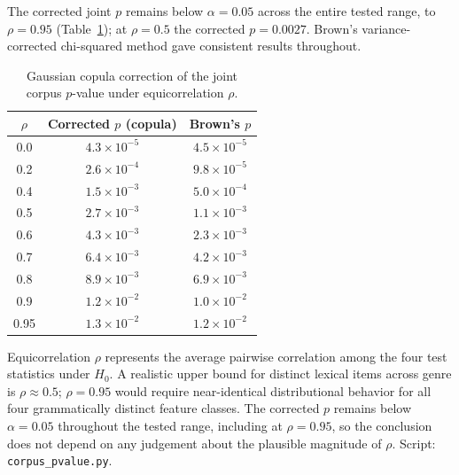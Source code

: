 \documentclass[11pt,a4paper]{article}
\begin{document}
The corrected joint $p$ remains below $\alpha = 0.05$ across the entire
tested range, to $\rho = 0.95$ (Table~\ref{tab:copula}); at $\rho=0.5$ the
corrected $p = 0.0027$. Brown's variance-corrected chi-squared
method\cite{brown1975} gave consistent results throughout.

\begin{table}[h]
\centering
\begin{threeparttable}
  \caption{Gaussian copula correction of the joint corpus $p$-value under
    equicorrelation $\rho$.}\label{tab:copula}
\begin{tabular}{@{}ccc@{}}
\toprule
$\rho$ & Corrected $p$ (copula) & Brown's $p$ \\
\midrule
0.0  & $4.3\times10^{-5}$ & $4.5\times10^{-5}$ \\
0.2  & $2.6\times10^{-4}$ & $9.8\times10^{-5}$ \\
0.4  & $1.5\times10^{-3}$ & $5.0\times10^{-4}$ \\
0.5  & $2.7\times10^{-3}$ & $1.1\times10^{-3}$ \\
0.6  & $4.3\times10^{-3}$ & $2.3\times10^{-3}$ \\
0.7  & $6.4\times10^{-3}$ & $4.2\times10^{-3}$ \\
0.8  & $8.9\times10^{-3}$ & $6.9\times10^{-3}$ \\
0.9  & $1.2\times10^{-2}$ & $1.0\times10^{-2}$ \\
0.95 & $1.3\times10^{-2}$ & $1.2\times10^{-2}$ \\
\bottomrule
\end{tabular}
  \begin{tablenotes}
    \footnotesize
    \item Equicorrelation $\rho$ represents the average pairwise
    correlation among the four test statistics under $H_0$. A realistic upper
    bound for distinct lexical items across genre is $\rho \approx 0.5$;
    $\rho = 0.95$ would require near-identical distributional behavior for
    all four grammatically distinct feature classes. The corrected $p$ remains
    below $\alpha = 0.05$ throughout the tested range, including at
    $\rho = 0.95$, so the conclusion does not depend on any judgement about
    the plausible magnitude of $\rho$.
    Script: \texttt{corpus\_pvalue.py}.
  \end{tablenotes}
\end{threeparttable}
\end{table}
\end{document}
